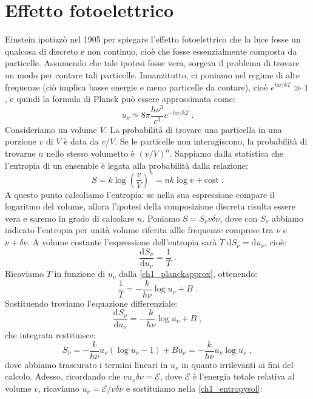 \documentclass[12pt,a4paper]{report}
\theoremstyle{definition}
\newcommand{\dev}[3][]{\frac{\mathrm{d}^{#1} #2}{\mathrm{d} #3^{#1}}}
\numberwithin{equation}{section}
\newcommand{\diff}[1][]{\mathrm{d}#1}
\begin{document}
\section{Effetto fotoelettrico}
Einstein ipotizzò nel 1905 per spiegare l'effetto fotoelettrico che la luce fosse un qualcosa di discreto e non continuo, cioè che fosse essenzialmente composta da particelle. Assumendo che tale ipotesi fosse vera, sorgeva il problema di trovare un modo per contare tali particelle. Innanzitutto, ci poniamo nel regime di alte frequenze (ciò implica basse energie e meno particelle da contare), cioè $e^{h\nu/kT}\gg 1$, e quindi la formula di Planck può essere approssimata come:
\begin{equation}
u_{\nu}\simeq 8\pi \frac{h\nu^3}{c^3}e^{-h\nu/kT}\;. \label{ch1_planckapprox}
\end{equation}
Consideriamo un volume $V$. La probabilità di trovare una particella in una porzione $v$ di $V$ è data da $v/V$. Se le particelle non interagiscono, la probabilità di trovarne $n$ nello stesso volumetto è $(v/V)^n$. Sappiamo dalla statistica che l'entropia di un ensemble è legata alla probabilità dalla relazione:
\begin{equation}
S=k\log\left(\frac{v}{V}\right)^n=nk\log v+\mathrm{cost}\;.
\end{equation}
A questo punto calcoliamo l'entropia: se nella sua espressione compare il logaritmo del volume, allora l'ipotesi della composizione discreta risulta essere vera e saremo in grado di calcolare $n$. Poniamo $S=S_{\nu}v \delta\nu$, dove con $S_{\nu}$ abbiamo indicato l'entropia per unità volume riferita allle frequenze comprese tra $\nu$ e $\nu+\delta\nu$. A volume costante l'espressione dell'entropia sarà $T\;\diff{S_{\nu}}=\diff{u_{\nu}}$, cioè:
$$
\dev{S_{\nu}}{u_{\nu}}=\frac{1}{T}\;.
$$
Ricaviamo $T$ in funzione di $u_{\nu}$ dalla \eqref{ch1_planckapprox}, ottenendo:
\begin{equation}
\frac{1}{T}=-\frac{k}{h\nu}\log u_{\nu}+B\;.
\end{equation}
Sostituendo troviamo l'equazione differenziale:
$$
\dev{S_{\nu}}{u_{\nu}}=-\frac{k}{h\nu}\log u_{\nu}+B\;,
$$
che integrata restituisce:
\begin{equation}
S_{\nu}=-\frac{k}{h\nu}u_{\nu}(\log u_{\nu}-1)+Bu_{\nu}=-\frac{k}{h\nu}u_{\nu}\log u_{\nu}\;, \label{ch1_entropysol}
\end{equation}
dove abbiamo trascurato i termini lineari in $u_{\nu}$ in quanto irrilevanti ai fini del calcolo. Adesso, ricordando che $v u_{\nu}\delta\nu=\mathcal{E}$, dove $\mathcal{E}$ è l'energia totale relativa al volume $v$, ricaviamo $u_{\nu}=\mathcal{E}/v\delta\nu$ e sostituiamo nella \eqref{ch1_entropysol}:
\end{document}
